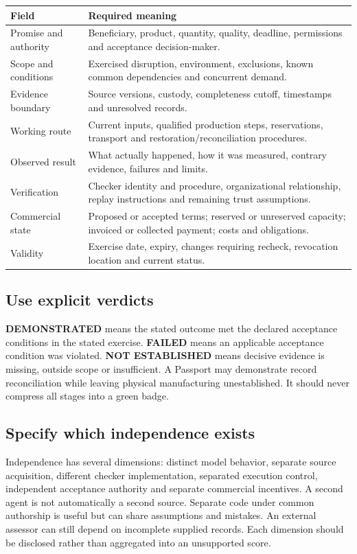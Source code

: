 \documentclass[11pt,a4paper]{article}
\newcommand{\status}[1]{\textsf{\textbf{#1}}}
\begin{document}
\begin{center}\small
\begin{tabularx}{\textwidth}{P{.25\textwidth}Y}
\toprule
\textbf{Field} & \textbf{Required meaning}\\
\midrule
Promise and authority & Beneficiary, product, quantity, quality, deadline, permissions and acceptance decision-maker.\\
Scope and conditions & Exercised disruption, environment, exclusions, known common dependencies and concurrent demand.\\
Evidence boundary & Source versions, custody, completeness cutoff, timestamps and unresolved records.\\
Working route & Current inputs, qualified production steps, reservations, transport and restoration/reconciliation procedures.\\
Observed result & What actually happened, how it was measured, contrary evidence, failures and limits.\\
Verification & Checker identity and procedure, organizational relationship, replay instructions and remaining trust assumptions.\\
Commercial state & Proposed or accepted terms; reserved or unreserved capacity; invoiced or collected payment; costs and obligations.\\
Validity & Exercise date, expiry, changes requiring recheck, revocation location and current status.\\
\bottomrule
\end{tabularx}
\end{center}

\subsection{Use explicit verdicts}
\status{DEMONSTRATED} means the stated outcome met the declared acceptance conditions in the stated exercise. \status{FAILED} means an applicable acceptance condition was violated. \status{NOT ESTABLISHED} means decisive evidence is missing, outside scope or insufficient. A Passport may demonstrate record reconciliation while leaving physical manufacturing unestablished. It should never compress all stages into a green badge.

\subsection{Specify which independence exists}
Independence has several dimensions: distinct model behavior, separate source acquisition, different checker implementation, separated execution control, independent acceptance authority and separate commercial incentives. A second agent is not automatically a second source. Separate code under common authorship is useful but can share assumptions and mistakes. An external assessor can still depend on incomplete supplied records. Each dimension should be disclosed rather than aggregated into an unsupported score.
\end{document}
